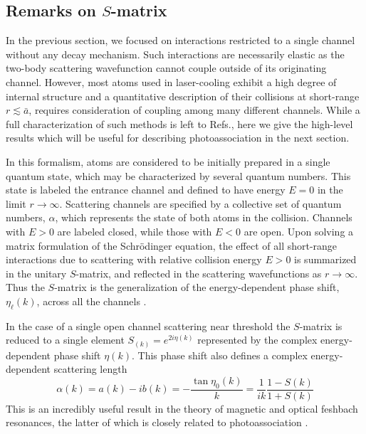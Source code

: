 \subsection{Remarks on $S$-matrix}
In the previous section, we focused on interactions restricted to a single channel without any decay mechanism.
Such interactions are necessarily elastic as the two-body scattering wavefunction cannot couple outside of its originating channel.
However, most atoms used in laser-cooling exhibit a high degree of internal structure and a quantitative description of their collisions at short-range $r \lesssim \bar{a} $, requires consideration of coupling among many different channels.
While a full characterization of such methods is left to Refs.\cite{Nicholson2015a,Hutson2007a,Quemener2012,Chin2010,Alexander2014,Vaillant2014}, here we give the high-level results which will be useful for describing photoassociation in the next section.

In this formalism, atoms are considered to be initially prepared in a single quantum state, which may be characterized by several quantum numbers.
This state is labeled the entrance channel and defined to have energy $E=0$ in the limit $r\rightarrow\infty$.
Scattering channels are specified by a collective set of quantum numbers, $\alpha$, which represents the state of both atoms in the collision.
Channels with $E>0$ are labeled closed, while those with $E<0$ are open.
Upon solving a matrix formulation of the Schr\"{o}dinger equation, the effect of all short-range interactions due to scattering with relative collision energy $E > 0$ is summarized in the unitary $S$-matrix, and reflected in the scattering wavefunctions as $r\rightarrow\infty$. 
Thus the $S$-matrix is the generalization of the energy-dependent phase shift, $\eta_{\ell}(k)$, across all the channels \cite{Julienne2009a}.

In the case of a single open channel scattering near threshold the $S$-matrix is reduced to a single element $S_(k)=e^{2i\eta(k)}$ represented by the complex energy-dependent phase shift $\eta(k)$.
This phase shift also defines a complex energy-dependent scattering length
\begin{equation}
	\alpha(k) = a(k) - i b(k) = -\frac{\tan \eta_0(k)}{k} = \frac{1}{ik} \frac{1-S(k)}{1+S(k)}
\end{equation}
This is an incredibly useful result in the theory of magnetic and optical feshbach resonances, the latter of which is closely related to photoassociation \cite{Chin2010,Nicholson2015a}.

